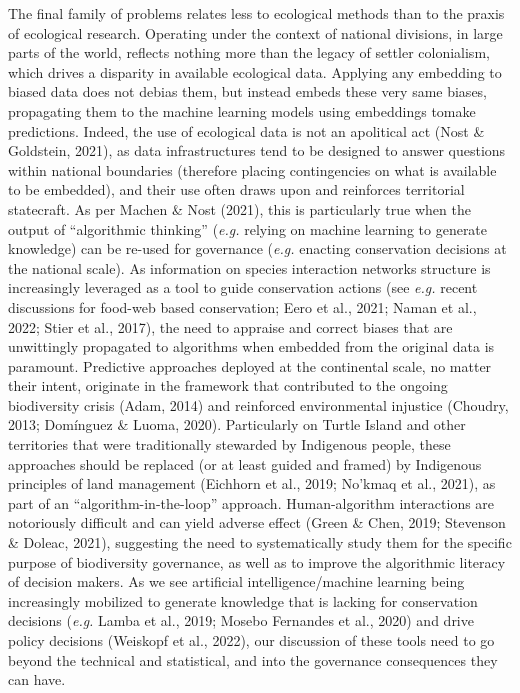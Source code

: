 \documentclass[10pt,oneside]{article}
\begin{document}
The final family of problems relates less to ecological methods than to
the praxis of ecological research. Operating under the context of
national divisions, in large parts of the world, reflects nothing more
than the legacy of settler colonialism, which drives a disparity in
available ecological data. Applying any embedding to biased data does
not debias them, but instead embeds these very same biases, propagating
them to the machine learning models using embeddings tomake predictions.
Indeed, the use of ecological data is not an apolitical act (Nost \&
Goldstein, 2021), as data infrastructures tend to be designed to answer
questions within national boundaries (therefore placing contingencies on
what is available to be embedded), and their use often draws upon and
reinforces territorial statecraft. As per Machen \& Nost (2021), this is
particularly true when the output of ``algorithmic thinking''
(\emph{e.g.} relying on machine learning to generate knowledge) can be
re-used for governance (\emph{e.g.} enacting conservation decisions at
the national scale). As information on species interaction networks
structure is increasingly leveraged as a tool to guide conservation
actions (see \emph{e.g.} recent discussions for food-web based
conservation; Eero et al., 2021; Naman et al., 2022; Stier et al.,
2017), the need to appraise and correct biases that are unwittingly
propagated to algorithms when embedded from the original data is
paramount. Predictive approaches deployed at the continental scale, no
matter their intent, originate in the framework that contributed to the
ongoing biodiversity crisis (Adam, 2014) and reinforced environmental
injustice (Choudry, 2013; Domínguez \& Luoma, 2020). Particularly on
Turtle Island and other territories that were traditionally stewarded by
Indigenous people, these approaches should be replaced (or at least
guided and framed) by Indigenous principles of land management (Eichhorn
et al., 2019; No'kmaq et al., 2021), as part of an
``algorithm-in-the-loop'' approach. Human-algorithm interactions are
notoriously difficult and can yield adverse effect (Green \& Chen, 2019;
Stevenson \& Doleac, 2021), suggesting the need to systematically study
them for the specific purpose of biodiversity governance, as well as to
improve the algorithmic literacy of decision makers. As we see
artificial intelligence/machine learning being increasingly mobilized to
generate knowledge that is lacking for conservation decisions
(\emph{e.g.} Lamba et al., 2019; Mosebo Fernandes et al., 2020) and
drive policy decisions (Weiskopf et al., 2022), our discussion of these
tools need to go beyond the technical and statistical, and into the
governance consequences they can have.
\end{document}
